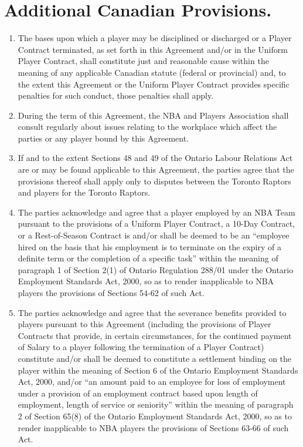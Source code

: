 \documentclass[
]{book}
\providecommand{\tightlist}{%
  \setlength{\itemsep}{0pt}\setlength{\parskip}{0pt}}
\begin{document}
\hypertarget{additional-canadian-provisions.}{%
\section{Additional Canadian Provisions.}\label{additional-canadian-provisions.}}

\begin{enumerate}
\def\labelenumi{(\alph{enumi})}
\tightlist
\item
  The bases upon which a player may be disciplined or discharged or a Player Contract terminated, as set forth in this Agreement and/or in the Uniform Player Contract, shall constitute just and reasonable cause within the meaning of any applicable Canadian statute (federal or provincial) and, to the extent this Agreement or the Uniform Player Contract provides specific penalties for such conduct, those penalties shall apply.
\item
  During the term of this Agreement, the NBA and Players Association shall consult regularly about issues relating to the workplace which affect the parties or any player bound by this Agreement.
\item
  If and to the extent Sections 48 and 49 of the Ontario Labour Relations Act are or may be found applicable to this Agreement, the parties agree that the provisions thereof shall apply only to disputes between the Toronto Raptors and players for the Toronto Raptors.
\item
  The parties acknowledge and agree that a player employed by an NBA Team pursuant to the provisions of a Uniform Player Contract, a 10-Day Contract, or a Rest-of-Season Contract is and/or shall be deemed to be an ``employee hired on the basis that his employment is to terminate on the expiry of a definite term or the completion of a specific task'' within the meaning of paragraph 1 of Section 2(1) of Ontario Regulation 288/01 under the Ontario Employment Standards Act, 2000, so as to render inapplicable to NBA players the provisions of Sections 54-62 of such Act.
\item
  The parties acknowledge and agree that the severance benefits provided to players pursuant to this Agreement (including the provisions of Player Contracts that provide, in certain circumstances, for the continued payment of Salary to a player following the termination of a Player Contract) constitute and/or shall be deemed to constitute a settlement binding on the player within the meaning of Section 6 of the Ontario Employment Standards Act, 2000, and/or ``an amount paid to an employee for loss of employment under a provision of an employment contract based upon length of employment, length of service or seniority'' within the meaning of paragraph 2 of Section 65(8) of the Ontario Employment Standards Act, 2000, so as to render inapplicable to NBA players the provisions of Sections 63-66 of such Act.

\end{enumerate}
\end{document}
